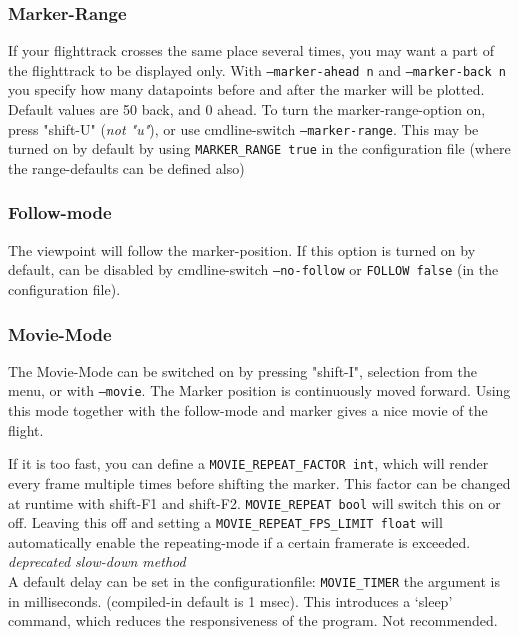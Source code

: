 \subsubsection{Marker-Range}

If your flighttrack crosses the same place several times, you may want a part of
the flighttrack to be displayed only. With \texttt{--marker-ahead n}  and \texttt{--marker-back n}
you specify how many datapoints before and after the marker will be plotted. Default values are
50 back, and 0 ahead. To turn the marker-range-option on, press "shift-U" (\emph{not "u"}), or use
cmdline-switch \texttt{--marker-range}. This may be turned on by default by using
\texttt{MARKER\_RANGE true} in the configuration file (where the range-defaults can be defined
also)

\subsubsection{Follow-mode}

The viewpoint will follow the marker-position. If this option is turned on by
default, can be disabled by cmdline-switch \texttt{--no-follow} or \texttt{FOLLOW false} (in  the configuration file).


\subsubsection{Movie-Mode}
\label{movie}
The Movie-Mode can be switched on by pressing "shift-I", selection from the menu, or with \texttt{--movie}.
The Marker position is continuously moved forward.
Using this mode together with the follow-mode and marker gives a nice movie of the flight.

If it is too fast, you can define a \texttt{MOVIE\_REPEAT\_FACTOR int}, which will render every frame multiple times before shifting the marker. This factor can be changed at runtime with shift-F1 and shift-F2.
\texttt{MOVIE\_REPEAT bool} will switch this on or off. Leaving this off and setting a \texttt{MOVIE\_REPEAT\_FPS\_LIMIT float} will  automatically enable the repeating-mode if a certain framerate is exceeded. \\

\emph{deprecated slow-down method} \\
A default delay can be set in the configurationfile:
\texttt{MOVIE\_TIMER} the argument is in milliseconds. (compiled-in default is 1 msec).
This introduces a `sleep' command, which reduces the responsiveness of the program. Not recommended.


